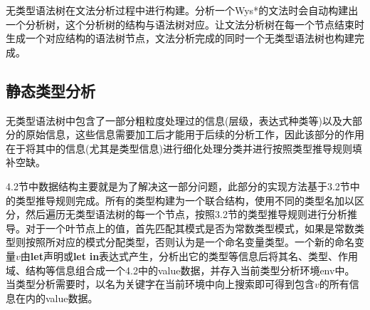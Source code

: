 无类型语法树在文法分析过程中进行构建。分析一个Wys*的文法时会自动构建出一个分析树，这个分析树的结构与语法树对应。让文法分析树在每一个节点结束时生成一个对应结构的语法树节点，文法分析完成的同时一个无类型语法树也构建完成。
\subsection{静态类型分析}
无类型语法树中包含了一部分粗粒度处理过的信息(层级，表达式种类等)以及大部分的原始信息，这些信息需要加工后才能用于后续的分析工作，因此该部分的作用在于将其中的信息(尤其是类型信息)进行细化处理分类并进行按照类型推导规则填补空缺。

4.2节中数据结构主要就是为了解决这一部分问题，此部分的实现方法基于3.2节中的类型推导规则完成。所有的类型构建为一个联合结构，使用不同的类型名加以区分，然后遍历无类型语法树的每一个节点，按照3.2节的类型推导规则进行分析推导。对于一个叶节点上的值，首先匹配其模式是否为常数类型模式，如果是常数类型则按照所对应的模式分配类型，否则认为是一个命名变量类型。一个新的命名变量$v$由\textbf{let}声明或\textbf{let} \textbf{in}表达式产生，分析出它的类型等信息后将其名、类型、作用域、结构等信息组合成一个4.2中的value数据，并存入当前类型分析环境env中。当类型分析需要时，以名为关键字在当前环境中向上搜索即可得到包含$v$的所有信息在内的value数据。

